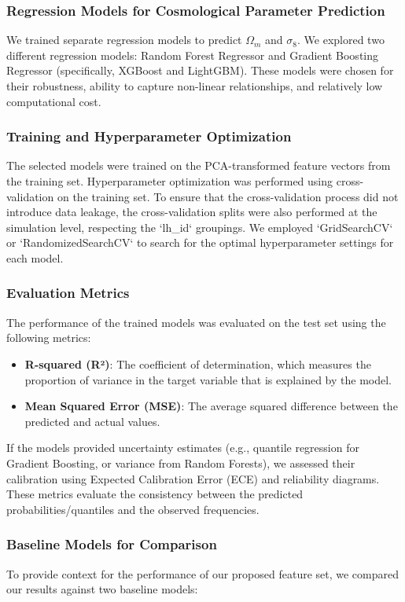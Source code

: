 \documentclass[twocolumn]{aastex631}
\begin{document}
\subsubsection{Regression Models for Cosmological Parameter Prediction}
We trained separate regression models to predict $\Omega_m$ and $\sigma_8$. We explored two different regression models: Random Forest Regressor and Gradient Boosting Regressor (specifically, XGBoost and LightGBM). These models were chosen for their robustness, ability to capture non-linear relationships, and relatively low computational cost.

\subsubsection{Training and Hyperparameter Optimization}
The selected models were trained on the PCA-transformed feature vectors from the training set. Hyperparameter optimization was performed using cross-validation on the training set. To ensure that the cross-validation process did not introduce data leakage, the cross-validation splits were also performed at the simulation level, respecting the `lh\_id` groupings. We employed `GridSearchCV` or `RandomizedSearchCV` to search for the optimal hyperparameter settings for each model.

\subsubsection{Evaluation Metrics}
The performance of the trained models was evaluated on the test set using the following metrics:

\begin{itemize}
    \item \textbf{R-squared (R²)}: The coefficient of determination, which measures the proportion of variance in the target variable that is explained by the model.
    \item \textbf{Mean Squared Error (MSE)}: The average squared difference between the predicted and actual values.
\end{itemize}

If the models provided uncertainty estimates (e.g., quantile regression for Gradient Boosting, or variance from Random Forests), we assessed their calibration using Expected Calibration Error (ECE) and reliability diagrams. These metrics evaluate the consistency between the predicted probabilities/quantiles and the observed frequencies.

\subsubsection{Baseline Models for Comparison}
To provide context for the performance of our proposed feature set, we compared our results against two baseline models:
\end{document}
